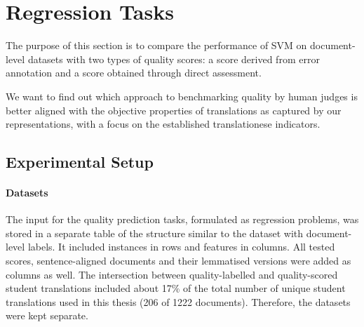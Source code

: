 
\section{\label{sec:_scores}Regression Tasks}
The purpose of this section is to compare the performance of SVM on document-level datasets with two types of quality scores: a score derived from error annotation and a score obtained through direct assessment.

We want to find out which approach to benchmarking quality by human judges is better aligned with the objective properties of translations as captured by our representations, with a focus on the established translationese indicators.

\subsection{\label{ssec:my_doc_regressors}Experimental Setup}

\paragraph{Datasets} 
The input for the quality prediction tasks, formulated as regression problems, was stored in a separate table of the structure similar to the dataset with document-level labels. It included instances in rows and features in columns. All tested scores, sentence-aligned documents and their lemmatised versions were added as columns as well. 
The intersection between quality-labelled and quality-scored student translations included about 17\% of the total number of unique student translations used in this thesis (206 of 1222 documents). 
Therefore, the datasets were kept separate.


